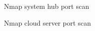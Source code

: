 \documentclass{article}
\begin{document}
\begin{figure}[!htb]
	\caption{Nmap system hub port scan}
\end{figure}

\begin{figure}[!htb]
	\caption{Nmap cloud server port scan}
\end{figure}
\end{document}
